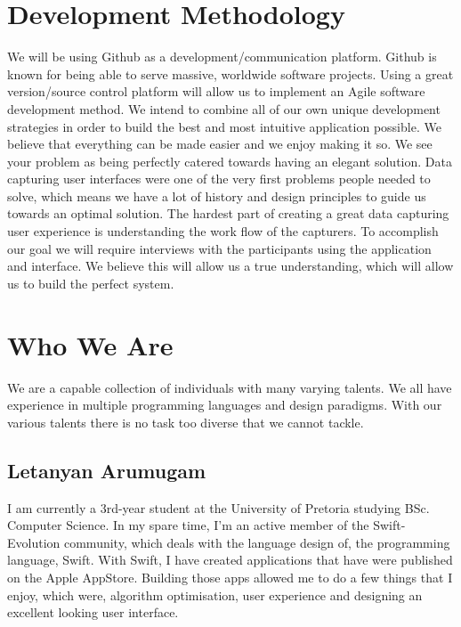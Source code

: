 \documentclass[12pt]{article}
\begin{document}
	\section{Development Methodology}
	We will be using Github as a development/communication platform. Github is known for being able to serve massive, worldwide software projects. Using a great version/source control platform will allow us to implement an Agile software development method. We intend to combine all of our own unique development strategies in order to build the best and most intuitive application possible. We believe that everything can be made easier and we enjoy making it so. We see your problem as being perfectly catered towards having an elegant solution. Data capturing user interfaces were one of the very first problems people needed to solve, which means we have a lot of history and design principles to guide us towards an optimal solution. The hardest part of creating a great data capturing user experience is understanding the work flow of the capturers. To accomplish our goal we will require interviews with the participants using the application and interface. We believe this will allow us a true understanding, which will allow us to build the perfect system.
	
	\section{Who We Are}
	We are a capable collection of individuals with many varying talents. We all have experience in multiple programming languages and design paradigms. With our various talents there is no task too diverse that we cannot tackle.
	
	\subsection{Letanyan Arumugam}
I am currently a 3rd-year student at the University of Pretoria studying BSc. Computer Science. In my spare time, I'm an active member of the Swift-Evolution community, which deals with the language design of, the programming language, Swift. With Swift, I have created applications that have were published on the Apple AppStore. Building those apps allowed me to do a few things that I enjoy, which were, algorithm optimisation, user experience and designing an excellent looking user interface.
\end{document}
